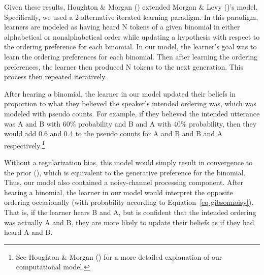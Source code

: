 \documentclass[
  12pt,
]{scrartcl}
\begin{document}
Given these results, Houghton \& Morgan
()
extended Morgan \& Levy
()'s
model. Specifically, we used a 2-alternative iterated learning paradigm.
In this paradigm, learners are modeled as having heard N tokens of a
given binomial in either alphabetical or nonalphabetical order while
updating a hypothesis with respect to the ordering preference for each
binomial. In our model, the learner's goal was to learn the ordering
preferences for each binomial. Then after learning the ordering
preferences, the learner then produced N tokens to the next generation.
This process then repeated iteratively.

After hearing a binomial, the learner in our model updated their beliefs
in proportion to what they believed the speaker's intended ordering was,
which was modeled with pseudo counts. For example, if they believed the
intended utterance was A and B with 60\% probability and B and A with
40\% probability, then they would add 0.6 and 0.4 to the pseudo counts
for A and B and B and A respectively.\footnote{See Houghton \& Morgan
  ()
  for a more detailed explanation of our computational model.}

Without a regularization bias, this model would simply result in
convergence to the prior
(), which is equivalent to the generative preference for the
binomial. Thus, our model also contained a noisy-channel processing
component. After hearing a binomial, the learner in our model would
interpret the opposite ordering occasionally (with probability according
to Equation~\ref{eq-gibsonnoisy}). That is, if the learner hears B and
A, but is confident that the intended ordering was actually A and B,
they are more likely to update their beliefs as if they had heard A and
B.
\end{document}
